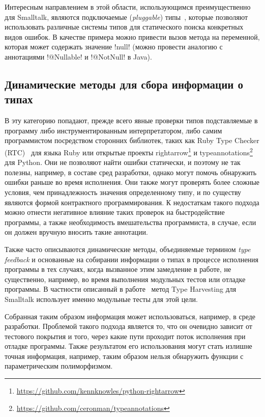 Интересным направлением в этой области, использующимся преимущественно для
Smalltalk, являются подключаемые (\emph{pluggable}) типы~\cite{Haldiman2009},
которые позволяют использовать различные системы типов для статического поиска
конкретных видов ошибок. В качестве примера можно привести вызов метода на
переменной, которая может содержать значение !null! (можно провести аналогию с
аннотациями !@Nullable! и !@NotNull! в Java). 

\subsection{Динамические методы для сбора информации о типах}
\label{sec:dynamic-checks}

В эту категорию попадают, прежде всего явные проверки типов подставляемые в
программу либо инструментированным интерпретатором, либо самим программистом
посредством сторонних библиотек, таких как Ruby Type Checker (RTC)~\cite{Ren2013}
для языка Ruby или открытые проекты
rightarrow\footnote{\url{https://github.com/kennknowles/python-rightarrow}} и
typeannotations\footnote{\url{https://github.com/ceronman/typeannotations}} для
Python.  Они не позволяют найти ошибки статически, и поэтому не так полезны,
например, в составе
сред разработки, однако могут помочь обнаружить ошибки раньше во время
исполнения.  Они также могут проверять более сложные условия, чем принадлежность
значения определенному типу, и по существу являются формой контрактного
программирования.  К недостаткам такого подхода можно отнести негативное влияние
таких проверок на быстродействие программы, а также необходимость вмешательства
программиста, в случае, если он должен вручную вносить такие аннотации. 

Также часто описываются динамические методы, объединяемые термином \emph{type
  feedback} и основанные на собирании информации о типах в процессе исполнения
программы в тех случаях, когда вызванное этим замедление в работе, не
существенно, например, во время выполнения модульных тестов или отладке
программы. В частности описанный в работе~\cite{Haupt2011} метод Type Harvesting
для Smalltalk использует именно модульные тесты для этой цели.

Собранная таким образом информация может использоваться, например, в среде
разработки.  Проблемой такого подхода является то, что он очевидно зависит от
тестового покрытия и того, через какие пути проходит поток исполнения при
отладке программы. Также результатом его использования могут стать излишне
точная информация, например, таким образом нельзя обнаружить функции с
параметрическим полиморфизмом.

